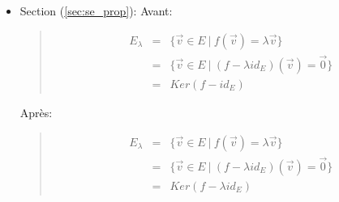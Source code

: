 \begin{itemize}
\begin{itemize}
      \item Section (\ref{sec:se_prop}): Avant:
        \begin{quote}
          \begin{eqnarray*}
            E_{\lambda} &=& \{\vec{v} \in E ~ \vert ~ f(\vec{v}) = \lambda\vec{v} \} \\
              &=& \{\vec{v} \in E ~ \vert ~ (f-\lambda id_E)(\vec{v}) = \vec{0} \} \\
              &=& Ker(f - id_E)
          \end{eqnarray*}
        \end{quote}
        Après:
        \begin{quote}
          \begin{eqnarray*}
            E_{\lambda} &=& \{\vec{v} \in E ~ \vert ~ f(\vec{v}) = \lambda\vec{v} \} \\
              &=& \{\vec{v} \in E ~ \vert ~ (f-\lambda id_E)(\vec{v}) = \vec{0} \} \\
              &=& Ker(f - \lambda id_E)
          \end{eqnarray*}
        \end{quote}
        
    \end{itemize}
\end{itemize}
